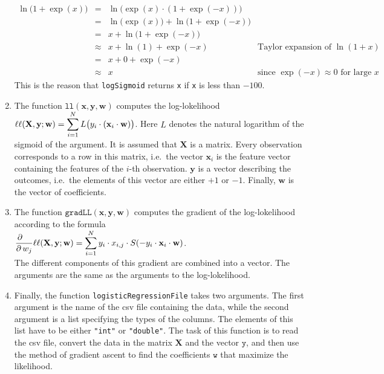 \begin{enumerate}
      \noindent
      \hspace*{1.3cm}
      $
      \begin{array}{lcll}
        \ln\bigl(1+\exp(x)\bigr) & = & \ln\bigl(\exp(x) \cdot (1+\exp(-x))\bigr)          \\[0.2cm]
                                 & = & \ln\bigl(\exp(x)\bigr) + \ln\bigl(1+\exp(-x)\bigr) \\[0.2cm]
                                 & = & x + \ln\bigl(1+\exp(-x)\bigr) \\[0.2cm]
                                 & \approx & x + \ln(1) + \exp(-x) & \mbox{Taylor expansion of $\ln(1+x)$} \\[0.2cm]
                                 & = & x + 0 + \exp(-x)                                      \\[0.2cm]
                                 & \approx & x                & \mbox{since $\exp(-x) \approx 0$ for large $x$} 
      \end{array}
      $
      \\[0.2cm]
      This is the reason that \texttt{logSigmoid} returns \texttt{x} if \texttt{x} is less than
      $-100$.
\item The function $\mathtt{ll}(\mathbf{x}, \mathbf{y}, \mathbf{w})$ computes the log-lokelihood
      $\displaystyle \ell\ell(\mathbf{X},\mathbf{y};\mathbf{w}) = 
           \sum\limits_{i=1}^N L\bigl(y_i \cdot(\mathbf{x}_i \cdot \mathbf{w})\bigr)
      $.
      Here $L$ denotes the natural logarithm of the sigmoid of the argument.
      It is assumed that $\mathbf{X}$ is a matrix.  Every observation corresponds to a row in this
      matrix, i.e.~the vector $\mathbf{x}_i$ is the feature vector containing the features of the
      $i$-th observation.  $\mathbf{y}$ is a vector describing the outcomes, i.e.~the elements
      of this vector are either $+1$ or $-1$.  Finally, $\mathbf{w}$ is the vector of coefficients.
\item The function $\mathtt{gradLL}(\mathbf{x}, \mathbf{y}, \mathbf{w})$ computes the gradient of
      the log-lokelihood according to the formula
      \\[0.2cm]
      \hspace*{1.3cm}
      $\displaystyle \frac{\partial\quad}{\partial\, w_j}\ell\ell(\mathbf{X},\mathbf{y};\mathbf{w}) =
        \displaystyle\sum\limits_{i=1}^N y_i \cdot x_{i,j} \cdot  S(-y_i \cdot \mathbf{x}_i \cdot \mathbf{w})
      $.
      \\[0.2cm]
      The different components of this gradient are combined into a vector.
      The arguments are the same as the arguments to the log-lokelihood.
\item Finally, the function \texttt{logisticRegressionFile} takes two arguments.  The first argument
      is the name of the csv file containing the data, while the second argument is a list specifying the types
      of the columns.  The elements of this list have to be either \texttt{"int"} or
      \texttt{"double"}.
      The task of this function is to read the csv file, convert the data in the matrix $\mathbf{X}$
      and the vector $\mathtt{y}$, and then use the method of gradient ascent to find the coefficients
      $\mathtt{w}$ that maximize the likelihood.
\end{enumerate}
